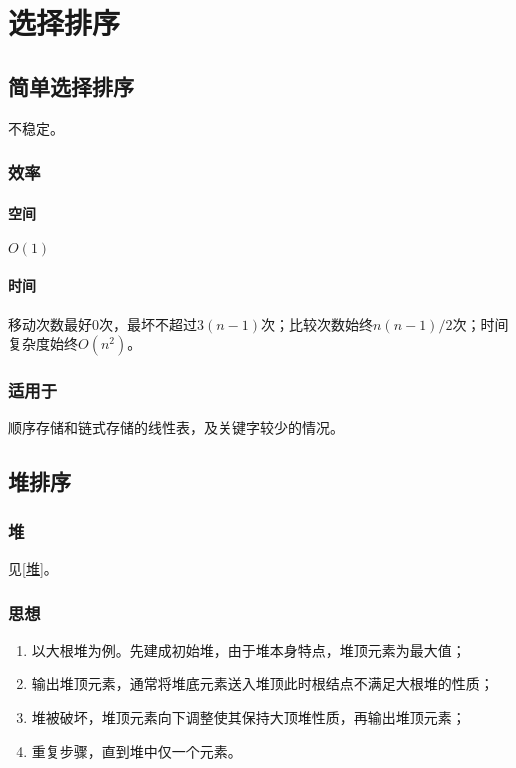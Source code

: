 \section{选择排序}

\subsection{简单选择排序}
不稳定。

\subsubsection{效率}

\paragraph{空间}
\(O(1)\)

\paragraph{时间}
移动次数最好0次，最坏不超过\(3(n - 1)\)次；比较次数始终\(n(n - 1) / 2\)次；时间复杂度始终\(O(n^2)\)。


\subsubsection{适用于}
顺序存储和链式存储的线性表，及关键字较少的情况。


\subsection{堆排序}

\subsubsection{堆}
见\ref{堆}。

\subsubsection{思想}
\begin{enumerate}
    \item 以大根堆为例。先建成初始堆，由于堆本身特点，堆顶元素为最大值；
    \item 输出堆顶元素，通常将堆底元素送入堆顶此时根结点不满足大根堆的性质；
    \item 堆被破坏，堆顶元素向下调整使其保持大顶堆性质，再输出堆顶元素；
    \item 重复步骤，直到堆中仅一个元素。
\end{enumerate}


